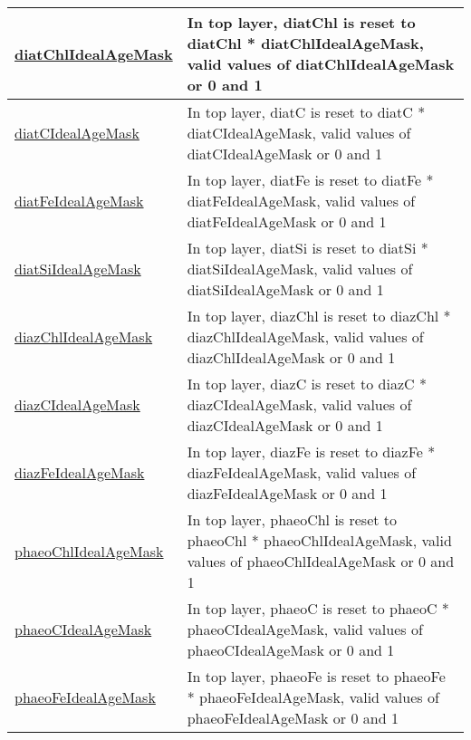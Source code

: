{\begin{center}
\begin{longtable}{| p{2.0in} | p{4.0in} |}
    \hline
    \hyperref[subsec:var_sec_tracersIdealAgeFields_diatChlIdealAgeMask]{diatChlIdealAgeMask} & In top layer, diatChl is reset to diatChl * diatChlIdealAgeMask, valid values of diatChlIdealAgeMask or 0 and 1 \\
    \hline
    \hyperref[subsec:var_sec_tracersIdealAgeFields_diatCIdealAgeMask]{diatCIdealAgeMask} & In top layer, diatC is reset to diatC * diatCIdealAgeMask, valid values of diatCIdealAgeMask or 0 and 1 \\
    \hline
    \hyperref[subsec:var_sec_tracersIdealAgeFields_diatFeIdealAgeMask]{diatFeIdealAgeMask} & In top layer, diatFe is reset to diatFe * diatFeIdealAgeMask, valid values of diatFeIdealAgeMask or 0 and 1 \\
    \hline
    \hyperref[subsec:var_sec_tracersIdealAgeFields_diatSiIdealAgeMask]{diatSiIdealAgeMask} & In top layer, diatSi is reset to diatSi * diatSiIdealAgeMask, valid values of diatSiIdealAgeMask or 0 and 1 \\
    \hline
    \hyperref[subsec:var_sec_tracersIdealAgeFields_diazChlIdealAgeMask]{diazChlIdealAgeMask} & In top layer, diazChl is reset to diazChl * diazChlIdealAgeMask, valid values of diazChlIdealAgeMask or 0 and 1 \\
    \hline
    \hyperref[subsec:var_sec_tracersIdealAgeFields_diazCIdealAgeMask]{diazCIdealAgeMask} & In top layer, diazC is reset to diazC * diazCIdealAgeMask, valid values of diazCIdealAgeMask or 0 and 1 \\
    \hline
    \hyperref[subsec:var_sec_tracersIdealAgeFields_diazFeIdealAgeMask]{diazFeIdealAgeMask} & In top layer, diazFe is reset to diazFe * diazFeIdealAgeMask, valid values of diazFeIdealAgeMask or 0 and 1 \\
    \hline
    \hyperref[subsec:var_sec_tracersIdealAgeFields_phaeoChlIdealAgeMask]{phaeoChlIdealAgeMask} & In top layer, phaeoChl is reset to phaeoChl * phaeoChlIdealAgeMask, valid values of phaeoChlIdealAgeMask or 0 and 1 \\
    \hline
    \hyperref[subsec:var_sec_tracersIdealAgeFields_phaeoCIdealAgeMask]{phaeoCIdealAgeMask} & In top layer, phaeoC is reset to phaeoC * phaeoCIdealAgeMask, valid values of phaeoCIdealAgeMask or 0 and 1 \\
    \hline
    \hyperref[subsec:var_sec_tracersIdealAgeFields_phaeoFeIdealAgeMask]{phaeoFeIdealAgeMask} & In top layer, phaeoFe is reset to phaeoFe * phaeoFeIdealAgeMask, valid values of phaeoFeIdealAgeMask or 0 and 1 \\
    \hline
\end{longtable}
\end{center}
}
